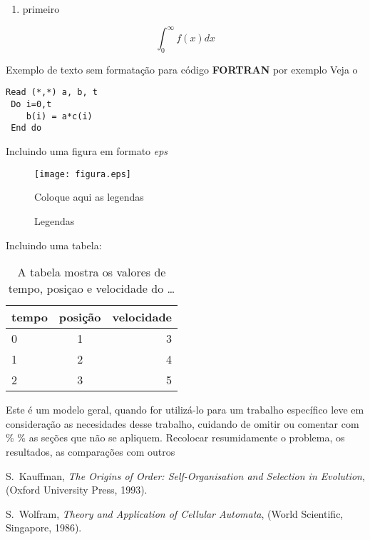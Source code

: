 \begin{enumerate}
  \item{ primeiro }
\end{enumerate}

\mbox{}

$$ \int_{0}^{\infty} f(x) dx $$

\vspace{0.5cm}

Exemplo de texto sem formatação para código {\bf FORTRAN} por exemplo
Veja o %
\begin{verbatim}
Read (*,*) a, b, t
 Do i=0,t
    b(i) = a*c(i)
 End do
\end{verbatim}

Incluindo uma figura em formato {\it eps}

\begin{figure}[hbtp]
\begin{center}
\texttt{[image: figura.eps]}
\caption{Coloque aqui as legendas}
\label{fig}
\end{center}
\end{figure}
\vspace{0.5cm}

\begin{figure}[htbp]
\begin{center}
\caption{Legendas}
\label{fig_rotacao}
\end{center}
\end{figure}

Incluindo uma tabela:
\begin{table}[h]
\begin{tabular}{||l|c|r||} \hline
tempo& posição & velocidade\\
\hline
 0 & 1 & 3\\
 1 & 2 & 4\\
 2 & 3 & 5\\
 \hline
 \end{tabular}
 \caption{A tabela mostra os valores de tempo, posiçao e velocidade do
{\ldots} }
\end{table}

{\color{red} Este é um modelo geral, quando for utilizá-lo para um trabalho
específico leve em consideração as necesidades desse trabalho,
cuidando de omitir ou comentar com \% \% as seções que não
se apliquem.}
Recolocar resumidamente o problema, os resultados, as comparações \cite{Wolfram_book} com outros
\begin{thebibliography}{99}
S.~Kauffman, {\em The Origins of Order: Self-Organisation and
Selection in Evolution}, (Oxford University Press, 1993).

S.~Wolfram, {\em Theory and Application of Cellular Automata},
(World Scientific, Singapore, 1986).
\end{thebibliography}

